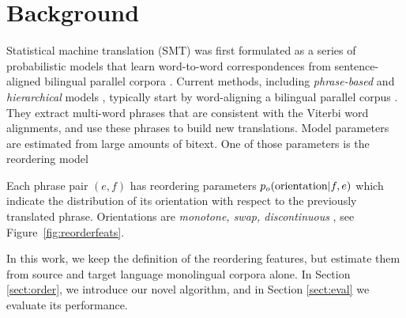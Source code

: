 \documentclass[11pt,letterpaper]{article}
\newcommand{\mnote}[1]{\marginpar{%
  \vskip-\baselineskip
  \raggedright\footnotesize
  \itshape\hrule\smallskip\tiny{#1}\par\smallskip\hrule}}
\newcommand{\mtodo}[1]{\mnote{\textcolor{red}{#1}}}
\newcommand{\figref}[1]{Figure~\ref{#1}}
\begin{document}
\section{Background} \label{sect:bckg}


Statistical machine translation (SMT) was first formulated as a series of probabilistic models that learn word-to-word correspondences from sentence-aligned bilingual parallel corpora \cite{Brown:1993}.  \nocite{Brown1988}
%
Current methods, including {\em phrase-based} \cite{Och:2002,Koehn:2003} and {\em hierarchical} models \cite{Chiang:2005}, typically start by word-aligning a bilingual parallel corpus \cite{Och2003}.  They extract multi-word phrases that are consistent with the Viterbi word alignments, and use these phrases to build new translations.  Model parameters are estimated from large amounts of bitext.  One of those parameters is the reordering model

Each phrase pair $(e, f)$ has reordering parameters $p_o(\textnormal{orientation}|f,e)$ which indicate the distribution of its orientation with respect to the previously translated phrase. Orientations are {\it monotone, swap, discontinuous} \cite{tillman:2004:HLTNAACL,Kumar2004}, see \figref{fig:reorderfeats}. 

In this work, we keep the definition of the reordering features, but estimate them from source and target language monolingual corpora alone. In Section \ref{sect:order}, we introduce our novel algorithm, and in Section \ref{sect:eval} we evaluate its performance. 
\end{document}
